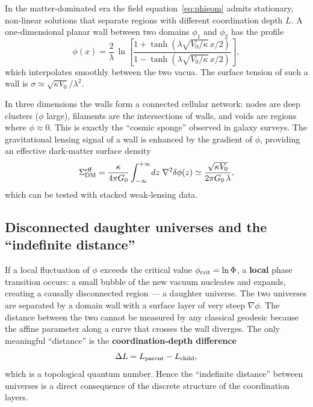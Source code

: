 \documentclass[12pt,a4paper]{article}
\begin{document}
	In the matter‑dominated era the field equation~\eqref{eq:phieom} admits stationary, non‑linear solutions
	that separate regions with different coordination depth $L$. A one‑dimensional planar wall between two
	domains $\phi_1$ and $\phi_2$ has the profile
	\begin{equation}
		\phi(x) = \frac{2}{\lambda}\,\ln\!\left[
		\frac{1 + \tanh(\lambda\sqrt{V_0/\kappa}\, x/2)}
		{1 - \tanh(\lambda\sqrt{V_0/\kappa}\, x/2)}
		\right],
		\label{eq:domain-wall}
	\end{equation}
	which interpolates smoothly between the two vacua. The surface tension of such a wall is
	$\sigma \simeq \sqrt{\kappa V_0}/\lambda^2$.
	
	In three dimensions the walls form a connected cellular network: nodes are deep clusters
	($\phi$ large), filaments are the intersections of walls, and voids are regions where
	$\phi \approx 0$\@. This is exactly the ``cosmic sponge'' observed in galaxy surveys.
	The gravitational lensing signal of a wall is enhanced by the gradient of $\phi$,
	providing an effective dark‑matter surface density
	\begin{equation}
		\Sigma_{\rm DM}^{\rm eff} = \frac{\kappa}{4\pi G_0} \int_{-\infty}^{+\infty} \!dz\; \nabla^2\delta\phi(z)
		\simeq \frac{\sqrt{\kappa V_0}}{2\pi G_0\,\lambda},
		\label{eq:wall-lensing}
	\end{equation}
	which can be tested with stacked weak‑lensing data.
	
	\subsection{Disconnected daughter universes and the ``indefinite distance''}
	
	If a local fluctuation of $\phi$ exceeds the critical value $\phi_{\rm crit}=\ln\Phi$,
	a \textbf{local} phase transition occurs: a small bubble of the new vacuum nucleates and
	expands, creating a causally disconnected region — a daughter universe.
	The two universes are separated by a domain wall with a surface layer of very steep
	$\nabla\phi$. The distance between the two cannot be measured by any classical
	geodesic because the affine parameter along a curve that crosses the wall diverges.
	The only meaningful ``distance'' is the \textbf{coordination‑depth difference}
	\begin{equation}
		\Delta L = L_{\rm parent} - L_{\rm child},
		\label{eq:deltaL}
	\end{equation}
	which is a topological quantum number. Hence the ``indefinite distance'' between
	universes is a direct consequence of the discrete structure of the coordination layers.
	
\end{document}
